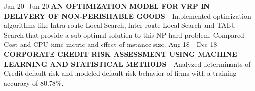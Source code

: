 \begin{cvskills}
  \cvskill
    {Jan 20- Jun 20}
    {\textbf{AN OPTIMIZATION MODEL FOR VRP IN DELIVERY OF NON-PERISHABLE GOODS} - Implemented optimization algorithms like Intra-route Local Search, Inter-route Local Search and TABU Search that provide a sub-optimal solution to this NP-hard problem. Compared Cost and CPU-time metric and effect of instance size.} %
  \cvskill
    {Aug 18 - Dec 18}
    {\textbf{CORPORATE CREDIT RISK ASSESSMENT USING MACHINE LEARNING AND STATISTICAL METHODS} - Analyzed determinants of Credit default risk and modeled default risk behavior of firms with a training accuracy of 80.78\%.}
\end{cvskills}  